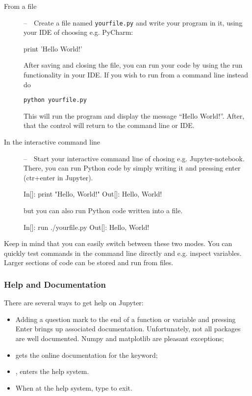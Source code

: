 \begin{description}
\item[From a file]--~~Create a file named \texttt{yourfile.py} and write your 
program in it, using your IDE of choosing e.g. PyCharm:

\begin{python}
print 'Hello World!'
\end{python}

After saving and closing the file, you can run your code by using the run
functionality in your IDE. If you wish to run from a command line instead do

\begin{verbatim}
python yourfile.py
\end{verbatim}

This will run the program and display the message ``Hello World!''. After, 
that the control will return to the command line or IDE.


\item[In the interactive command line]--~~Start your interactive command line of
chosing e.g. Jupyter-notebook. There, you can run Python code
by simply writing it and pressing enter (ctr+enter in Jupyter).

\begin{python}
 In[]: print "Hello, World!"
Out[]: Hello, World!
\end{python}

but you can also run Python code written into a file.

\begin{python}
 In[]: run ./yourfile.py
Out[]: Hello, World!
\end{python}
\end{description}

Keep in mind that you can easily switch between these two modes. You can
quickly test commands in the command line directly and e.g. inspect variables.
Larger sections of code can be stored and run from files.

\subsubsection{Help and Documentation}

There are several ways to get help on Jupyter:

\begin{itemize}
\item Adding a question mark to the end of a function or variable and pressing
Enter brings up associated documentation. Unfortunately, not all packages are
well documented. Numpy and matplotlib are pleasant exceptions;
\item {} gets the online documentation for the  keyword;
\item {}, enters the help system.
\item When at the help system, type  to exit.
\end{itemize}

